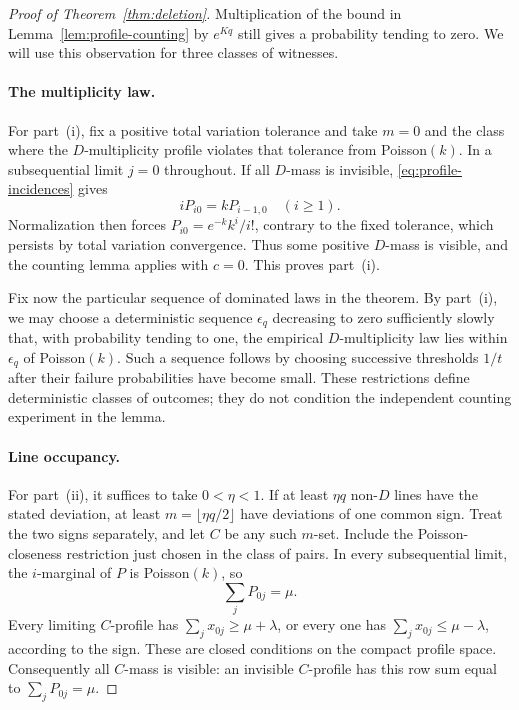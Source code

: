 \begin{proof}[Proof of Theorem~\ref{thm:deletion}]
Multiplication of the bound in Lemma~\ref{lem:profile-counting} by $e^{Kq}$
still gives a probability tending to zero.  We will use this observation
for three classes of witnesses.

\paragraph{The multiplicity law.}
For part~\textup{(i)}, fix a positive total variation tolerance and take
$m=0$ and the class where the $D$-multiplicity profile violates that
tolerance from Poisson$(k)$.  In a subsequential limit $j=0$ throughout.
If all $D$-mass is invisible, \eqref{eq:profile-incidences} gives
\[
 iP_{i0}=kP_{i-1,0}\quad(i\ge1).
\]
Normalization then forces $P_{i0}=e^{-k}k^i/i!$, contrary to the fixed
tolerance, which persists by total variation convergence.  Thus some
positive $D$-mass is visible, and the counting lemma applies with $c=0$.
This proves part~\textup{(i)}.

Fix now the particular sequence of dominated laws in the theorem.  By
part~\textup{(i)}, we may choose a deterministic sequence $\epsilon_q$
decreasing to zero sufficiently slowly that, with probability tending
to one, the empirical $D$-multiplicity law lies within $\epsilon_q$ of
Poisson$(k)$.  Such a sequence follows by choosing successive thresholds
$1/t$ after their failure probabilities have become small.  These
restrictions define deterministic classes of outcomes; they do not
condition the independent counting experiment in the lemma.

\paragraph{Line occupancy.}
For part~\textup{(ii)}, it suffices to take $0<\eta<1$.  If at least
$\eta q$ non-$D$ lines have the stated deviation, at least
$m=\lfloor\eta q/2\rfloor$ have deviations of one common sign.  Treat
the two signs separately, and let $C$ be any such $m$-set.  Include the
Poisson-closeness restriction just chosen in the class of pairs.
In every subsequential limit, the $i$-marginal of $P$ is Poisson$(k)$, so
\[
 \sum_jP_{0j}=\mu.
\]
Every limiting $C$-profile has $\sum_jx_{0j}\ge\mu+\lambda$, or every
one has $\sum_jx_{0j}\le\mu-\lambda$, according to the sign.  These are
closed conditions on the compact profile space.  Consequently all
$C$-mass is visible: an invisible $C$-profile has this row sum equal to
$\sum_jP_{0j}=\mu$.


\end{proof}
